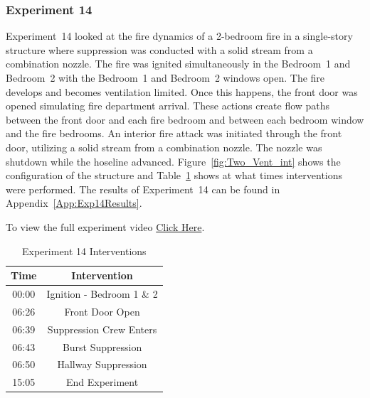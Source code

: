 \documentclass[12pt,oneside]{book}
\begin{document}
\subsubsection{Experiment 14}
Experiment~14 looked at the fire dynamics of a 2-bedroom fire in a single-story structure where suppression was conducted with a solid stream from a combination nozzle. The fire was ignited simultaneously in the Bedroom~1 and Bedroom~2 with the Bedroom~1 and Bedroom~2 windows open. The fire develops and becomes ventilation limited. Once this happens, the front door was opened simulating fire department arrival. These actions create flow paths between the front door and each fire bedroom and between each bedroom window and the fire bedrooms. An interior fire attack was initiated through the front door, utilizing a solid stream from a combination nozzle. The nozzle was shutdown while the hoseline advanced. Figure~\ref{fig:Two_Vent_int} shows the configuration of the structure and Table~\ref{Table:Exp14Interventions} shows at what times interventions were performed. The results of Experiment~14 can be found in Appendix~\ref{App:Exp14Results}. 

To view the full experiment video \href{https://player.vimeo.com/video/170499611?autoplay=1}{Click Here}.

\begin{table}[H]
	\centering
	\caption{Experiment 14 Interventions}
	\begin{tabular}{|c|c|} 
		\hline
		Time & Intervention \\ \hline \hline
		00:00 & Ignition - Bedroom 1 \& 2 \\ \hline
		06:26 & Front Door Open \\ \hline
		06:39 & Suppression Crew Enters\\ \hline
		06:43 & Burst Suppression \\ \hline 
		06:50 & Hallway Suppression \\ \hline
		15:05 & End Experiment\\ \hline
	\end{tabular}
	\label{Table:Exp14Interventions}
\end{table}

\FloatBarrier
\end{document}
